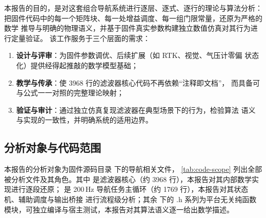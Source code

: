 本报告的目的，是对这套组合导航系统进行逐层、逐式、逐行的理论与算法分析：
把固件代码中的每一个矩阵块、每一处增益调度、每一组门限常量，还原为严格的数学
推导与明确的物理语义，并基于固件真实参数构建独立数值仿真对其行为进行定量验证。
该工作服务于三个层面的需求：
\begin{enumerate}
  \item \textbf{设计与评审}：为固件参数调优、后续扩展（如 RTK、视觉、气压计零偏
    状态化）提供经得起推敲的数学模型基础；
  \item \textbf{教学与传承}：使 3968 行的滤波器核心代码不再依赖``注释即文档''，
    而具备可与公式一一对照的完整理论映射；
  \item \textbf{验证与审计}：通过独立仿真复现滤波器在典型场景下的行为，检验算法
    语义与实现的一致性，并明确系统的适用边界。
\end{enumerate}

\subsection{分析对象与代码范围}

本报告的分析对象为固件源码目录  下的导航相关文件，
\cref{tab:code-scope} 列出全部被分析文件及其角色。其中 
是滤波器核心（约 3968 行），本报告对其内部数学实现进行逐段还原；
是 200\,Hz 导航任务主循环（约 1769 行），本报告对其状态机、辅助调度与输出桥接
进行流程级分析；其余  下的 .h 系列为平台无关纯函数
模块，可独立编译与宿主测试，本报告对其算法语义逐一给出数学描述。

